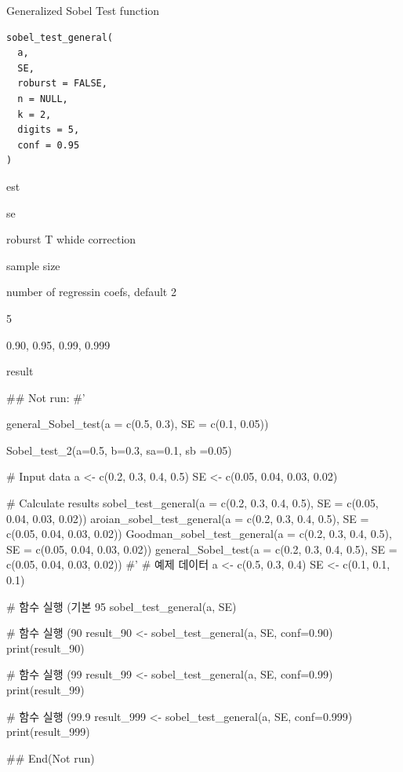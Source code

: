 \documentclass[a4paper]{book}
\begin{document}
%
\begin{Description}
Generalized Sobel Test function
\end{Description}
%
\begin{Usage}
\begin{verbatim}
sobel_test_general(
  a,
  SE,
  roburst = FALSE,
  n = NULL,
  k = 2,
  digits = 5,
  conf = 0.95
)
\end{verbatim}
\end{Usage}
%
\begin{Arguments}
\begin{ldescription}
\item[\code{a}] est

\item[\code{SE}] se

\item[\code{roburst}] roburst T whide correction

\item[\code{n}] sample size

\item[\code{k}] number of regressin coefs, default 2

\item[\code{digits}] 5

\item[\code{conf}] 0.90, 0.95, 0.99, 0.999
\end{ldescription}
\end{Arguments}
%
\begin{Value}
result
\end{Value}
%
\begin{Examples}
\begin{ExampleCode}

## Not run: 
#'

general_Sobel_test(a = c(0.5, 0.3), SE = c(0.1, 0.05))

Sobel_test_2(a=0.5, b=0.3, sa=0.1, sb =0.05)

# Input data
a <- c(0.2, 0.3, 0.4, 0.5)
SE <- c(0.05, 0.04, 0.03, 0.02)

# Calculate results
sobel_test_general(a = c(0.2, 0.3, 0.4, 0.5), SE = c(0.05, 0.04, 0.03, 0.02))
aroian_sobel_test_general(a = c(0.2, 0.3, 0.4, 0.5), SE = c(0.05, 0.04, 0.03, 0.02))
Goodman_sobel_test_general(a = c(0.2, 0.3, 0.4, 0.5), SE = c(0.05, 0.04, 0.03, 0.02))
general_Sobel_test(a = c(0.2, 0.3, 0.4, 0.5), SE = c(0.05, 0.04, 0.03, 0.02))
#'
# 예제 데이터
a <- c(0.5, 0.3, 0.4)
SE <- c(0.1, 0.1, 0.1)

# 함수 실행 (기본 95%
sobel_test_general(a, SE)

# 함수 실행 (90%
result_90 <- sobel_test_general(a, SE, conf=0.90)
print(result_90)

# 함수 실행 (99%
result_99 <- sobel_test_general(a, SE, conf=0.99)
print(result_99)

# 함수 실행 (99.9%
result_999 <- sobel_test_general(a, SE, conf=0.999)
print(result_999)


## End(Not run)


\end{ExampleCode}
\end{Examples}
\end{document}
